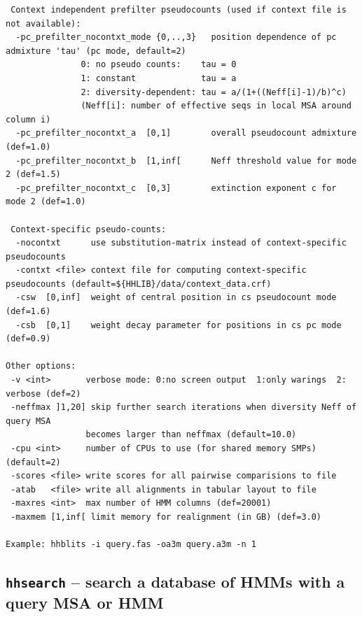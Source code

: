 \documentclass[11pt,a4paper]{article}
\begin{document}
\begin{verbatim}
 Context independent prefilter pseudocounts (used if context file is not available):
  -pc_prefilter_nocontxt_mode {0,..,3}   position dependence of pc admixture 'tau' (pc mode, default=2) 
               0: no pseudo counts:    tau = 0                                  
               1: constant             tau = a                                  
               2: diversity-dependent: tau = a/(1+((Neff[i]-1)/b)^c)            
               (Neff[i]: number of effective seqs in local MSA around column i) 
  -pc_prefilter_nocontxt_a  [0,1]        overall pseudocount admixture (def=1.0)                        
  -pc_prefilter_nocontxt_b  [1,inf[      Neff threshold value for mode 2 (def=1.5)                      
  -pc_prefilter_nocontxt_c  [0,3]        extinction exponent c for mode 2 (def=1.0)                     

 Context-specific pseudo-counts:                                                  
  -nocontxt      use substitution-matrix instead of context-specific pseudocounts 
  -contxt <file> context file for computing context-specific pseudocounts (default=${HHLIB}/data/context_data.crf)
  -csw  [0,inf]  weight of central position in cs pseudocount mode (def=1.6)
  -csb  [0,1]    weight decay parameter for positions in cs pc mode (def=0.9)

Other options:                                                                   
 -v <int>       verbose mode: 0:no screen output  1:only warings  2: verbose (def=2)
 -neffmax ]1,20] skip further search iterations when diversity Neff of query MSA 
                becomes larger than neffmax (default=10.0)
 -cpu <int>     number of CPUs to use (for shared memory SMPs) (default=2)      
 -scores <file> write scores for all pairwise comparisions to file               
 -atab   <file> write all alignments in tabular layout to file                   
 -maxres <int>  max number of HMM columns (def=20001)             
 -maxmem [1,inf[ limit memory for realignment (in GB) (def=3.0)          

Example: hhblits -i query.fas -oa3m query.a3m -n 1  
\end{verbatim} 
\normalsize


\subsection{{\tt hhsearch} -- search a database of HMMs with a query MSA or HMM}
\end{document}
